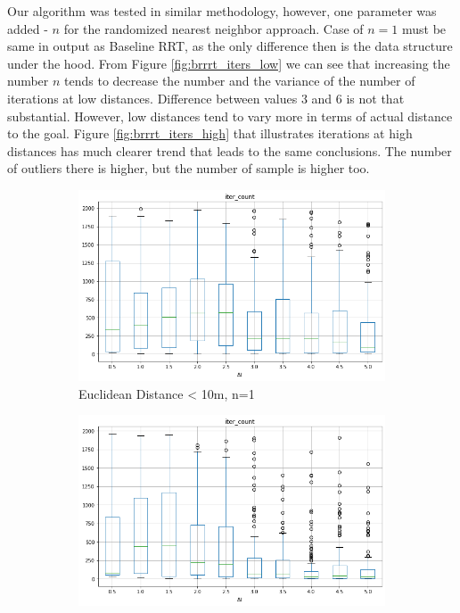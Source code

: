 \documentclass[a4paper,12pt]{article}
\DeclareRobustCommand{\[}{\begin{equation}}
\DeclareRobustCommand{\]}{\end{equation}}
\numberwithin{equation}{section}
\numberwithin{algorithm}{section}
\begin{document}
Our algorithm was tested in similar methodology, however, one parameter was added - $n$ for the randomized nearest neighbor approach. 
Case of $n=1$ must be same in output as Baseline RRT, as the only difference then is the data structure under the hood. From Figure \ref{fig:brrrt_iters_low} we can see
that increasing the number $n$ tends to decrease the number and the variance of the number of iterations at low distances. Difference between values 3 and 6 is not that
substantial. However, low distances tend to vary more in terms of actual distance to the goal. Figure \ref{fig:brrrt_iters_high} that illustrates iterations at high distances
has much clearer trend that leads to the same conclusions. The number of outliers there is higher, but the number of sample is higher too. 

\begin{figure}[H]
\centering
    \begin{subfigure}[b]{0.6\textwidth}
        \includegraphics[scale=1,width=\textwidth]{images/brrrt_iters_low_n_1.png}
        \caption{Euclidean Distance < 10m, n=1}
        \label{fig:baseline_edge_len_fail_dist}
    \end{subfigure}
    \begin{subfigure}[b]{0.6\textwidth}
        \includegraphics[scale=1,width=\textwidth]{images/brrrt_iters_low_n_3.png}

\end{subfigure}
\end{figure}
\end{document}

